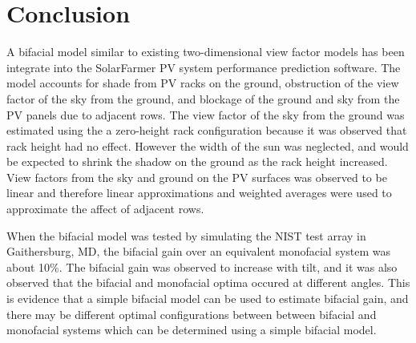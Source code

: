\documentclass[conference]{IEEEtran}
\begin{document}

\section{Conclusion}
A bifacial model similar to existing two-dimensional view factor models has been integrate into the SolarFarmer PV system performance prediction software.  The model accounts for shade from PV racks on the ground, obstruction of the view factor of the sky from the ground, and blockage of the ground and sky from the PV panels due to adjacent rows.  The view factor of the sky from the ground was estimated using the a zero-height rack configuration because it was observed that rack height had no effect.  However the width of the sun was neglected, and would be expected to shrink the shadow on the ground as the rack height increased.  View factors from the sky and ground on the PV surfaces was observed to be linear and therefore linear approximations and weighted averages were used to approximate the affect of adjacent rows.

When the bifacial model was tested by simulating the NIST test array in Gaithersburg, MD, the bifacial gain over an equivalent monofacial system was about 10\%.  The bifacial gain was observed to increase with tilt,  and it was also observed that the bifacial and monofacial optima occured at different angles.  This is evidence that a simple bifacial model can be used to estimate bifacial gain, and there may be different optimal configurations between between bifacial and monofacial systems which can be determined using a simple bifacial model.






%

\vfil\eject

\end{document}
